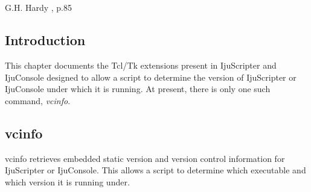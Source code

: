 
\chapter{\cvctzerolongtitle{}}

\label{cvct0}

                   {G.H. Hardy \cite{bibref:b:mathematiciansapology:1940},
                   p.85}

\section{Introduction}
This chapter documents the Tcl/Tk extensions present in IjuScripter and IjuConsole
designed to allow a script to determine the version of IjuScripter or IjuConsole under
which it is running.  At present, there is only one such command, \emph{vcinfo}.


\section{vcinfo}

\begin{tclcommandname}{vcinfo}%
retrieves embedded static version and version control information for IjuScripter or IjuConsole.
This allows a script to determine which executable and which version it is
running under.
\end{tclcommandname}

\begin{tclcommandsynopsis}
\end{tclcommandsynopsis}

